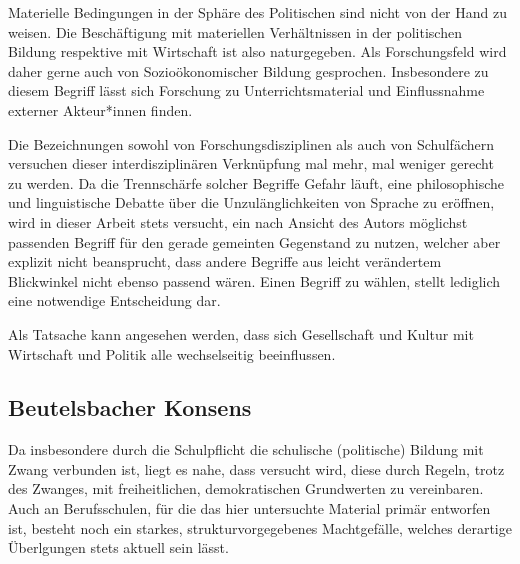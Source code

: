 Materielle Bedingungen in der Sphäre des Politischen sind nicht von der Hand zu weisen. Die Beschäftigung mit materiellen Verhältnissen in der politischen Bildung respektive mit Wirtschaft ist also naturgegeben.
Als Forschungsfeld wird daher gerne auch von Sozioökonomischer Bildung gesprochen.
Insbesondere zu diesem Begriff lässt sich Forschung zu Unterrichtsmaterial und Einflussnahme externer Akteur*innen finden.


Die Bezeichnungen sowohl von Forschungsdisziplinen als auch von Schulfächern versuchen dieser interdisziplinären Verknüpfung mal mehr, mal weniger gerecht zu werden.
Da die Trennschärfe solcher Begriffe Gefahr läuft, eine philosophische und linguistische Debatte über die Unzulänglichkeiten von Sprache zu eröffnen, wird in dieser Arbeit stets versucht, ein nach Ansicht des Autors möglichst passenden Begriff für den gerade gemeinten Gegenstand zu nutzen, welcher aber explizit nicht beansprucht, dass andere Begriffe aus leicht verändertem Blickwinkel nicht ebenso passend wären. Einen Begriff zu wählen, stellt lediglich eine notwendige Entscheidung dar. 


\noindent Als Tatsache kann angesehen werden, dass sich Gesellschaft und Kultur mit Wirtschaft und Politik alle wechselseitig beeinflussen. 


\subsection{Beutelsbacher Konsens \label{bbk}}%
Da insbesondere durch die Schulpflicht \autocite{BremSchulG} die schulische (politische) Bildung mit Zwang verbunden ist, liegt es nahe, dass versucht wird, diese durch Regeln, trotz des Zwanges, mit freiheitlichen, demokratischen Grundwerten zu vereinbaren. Auch an Berufsschulen, für die das hier untersuchte Material primär entworfen ist, besteht noch ein starkes, strukturvorgegebenes Machtgefälle, welches derartige Überlgungen stets aktuell sein lässt. 

